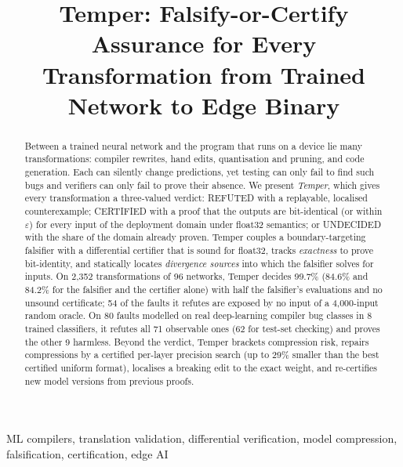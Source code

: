 \documentclass[conference]{IEEEtran}
\begin{document}
\title{Temper: Falsify-or-Certify Assurance for Every Transformation from Trained Network to Edge Binary}

\author{
}

\maketitle

\begin{abstract}
Between a trained neural network and the program that runs on a device lie many transformations: compiler rewrites, hand edits, quantisation and pruning, and code generation. Each can silently change predictions, yet testing can only fail to find such bugs and verifiers can only fail to prove their absence. We present \emph{Temper}, which gives every transformation a three-valued verdict: REFUTED with a replayable, localised counterexample; CERTIFIED with a proof that the outputs are bit-identical (or within $\varepsilon$) for every input of the deployment domain under float32 semantics; or UNDECIDED with the share of the domain already proven. Temper couples a boundary-targeting falsifier with a differential certifier that is sound for float32, tracks \emph{exactness} to prove bit-identity, and statically locates \emph{divergence sources} into which the falsifier solves for inputs. On 2{,}352 transformations of 96 networks, Temper decides 99.7\% (84.6\% and 84.2\% for the falsifier and the certifier alone) with half the falsifier's evaluations and no unsound certificate; 54 of the faults it refutes are exposed by no input of a 4{,}000-input random oracle. On 80 faults modelled on real deep-learning compiler bug classes in 8 trained classifiers, it refutes all 71 observable ones (62 for test-set checking) and proves the other 9 harmless. Beyond the verdict, Temper brackets compression risk, repairs compressions by a certified per-layer precision search (up to 29\% smaller than the best certified uniform format), localises a breaking edit to the exact weight, and re-certifies new model versions from previous proofs.
\end{abstract}

\begin{IEEEkeywords}
ML compilers, translation validation, differential verification, model compression, falsification, certification, edge AI
\end{IEEEkeywords}
\end{document}
